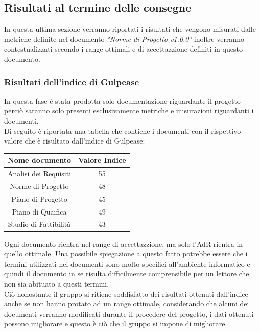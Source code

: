 \documentclass[12pt,a4paper,titlepage]{article}
\begin{document}
	\subsection{Risultati al termine delle consegne}
	In questa ultima sezione verranno riportati i risultati che vengono misurati dalle metriche definite nel documento \textit{"Norme di Progetto v1.0.0"} inoltre verranno contestualizzati secondo i range ottimali e di accettazzione definiti in questo documento.\\
	
	
	\subsubsection{Risultati dell'indice di Gulpease}
	In questa fase è stata prodotta solo documentazione riguardante il progetto perciò saranno solo presenti esclusivamente metriche e misurazioni riguardanti i documenti.\\
	Di seguito è riportata una tabella che contiene i documenti con il rispettivo valore che è risultato dall'indice di Gulpease:
	\begin{tabular}{|c|c|}
    	{\textbf{Nome documento}}&{\textbf{Valore Indice}}\\
    	\hline
    	Analisi dei Requisiti & 55\\
    	\hline
    	Norme di Progetto & 48\\
    	\hline
    	Piano di Progetto & 45\\
    	\hline
    	Piano di Quaifica & 49\\
    	\hline
    	Studio di Fattibilità & 43\\
    \end{tabular}
    Ogni documento rientra nel range di accettazzione, ma solo l'AdR rientra in quello ottimale. Una possibile spiegazione a questo fatto potrebbe essere che i termini utilizzati nei documenti sono molto specifici all'ambiente informatico e quindi il documento in se risulta difficilmente comprensibile 
    per un lettore che non sia abituato a questi termini.\\
    Ciò nonostante il gruppo si ritiene soddisfatto dei risultati ottenuti dall'indice anche se non hanno protato ad un range ottimale, considerando che alcuni dei documenti verranno modificati durante il procedere del progetto, i dati ottenuti possono migliorare e questo è ciò che il gruppo si impone di migliorare.\\
    
\end{document}

